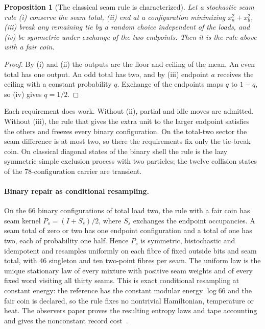 \documentclass[11pt]{article}
\newtheorem{proposition}[theorem]{Proposition}
\theoremstyle{remark}
\theoremstyle{plain}
\begin{document}
\begin{proposition}[The classical seam rule is characterized]
\label{prop:classical-seam-rule}
Let a stochastic seam rule (i) conserve the seam total, (ii) end at a
configuration minimizing \(x_a^2+x_b^2\), (iii) break any remaining tie by a
random choice independent of the loads, and (iv) be symmetric under exchange
of the two endpoints. Then it is the rule above with a fair coin.
\end{proposition}

\begin{proof}
By (i) and (ii) the outputs are the floor and ceiling of the mean. An even
total has one output. An odd total has two, and by (iii) endpoint \(a\)
receives the ceiling with a constant probability \(q\). Exchange of the
endpoints maps \(q\) to \(1-q\), so (iv) gives \(q=1/2\).
\end{proof}

Each requirement does work. Without (ii), partial and idle moves are
admitted. Without (iii), the rule that gives the extra unit to the larger
endpoint satisfies the others and freezes every binary configuration. On the
total-two sector the seam difference is at most two, so there the
requirements fix only the tie-break coin. On classical diagonal states of
the binary shell the rule is the lazy symmetric simple exclusion process with
two particles; the twelve collision states of the \(78\)-configuration
carrier are transient.

\paragraph{Binary repair as conditional resampling.}
On the \(66\) binary configurations of total load two, the rule with a fair coin
has seam kernel \(P_s=(I+S_s)/2\), where \(S_s\) exchanges the endpoint occupancies.
A seam total of zero or two has one endpoint configuration and a total of one has
two, each of probability one half. Hence \(P_s\) is symmetric, bistochastic and
idempotent and resamples uniformly on each fibre of fixed outside bits and seam
total, with \(46\) singleton and ten two-point fibres per seam. The uniform law is
the unique stationary law of every mixture with positive seam weights and of every
fixed word visiting all thirty seams. This is exact conditional resampling at
constant energy: the reference has the constant modular energy \(\log66\) and the
fair coin is declared, so the rule fixes no nontrivial Hamiltonian, temperature or
heat. The observers paper proves the resulting entropy laws and tape accounting and
gives the nonconstant record cost~\cite{ophobservers}.
\end{document}
